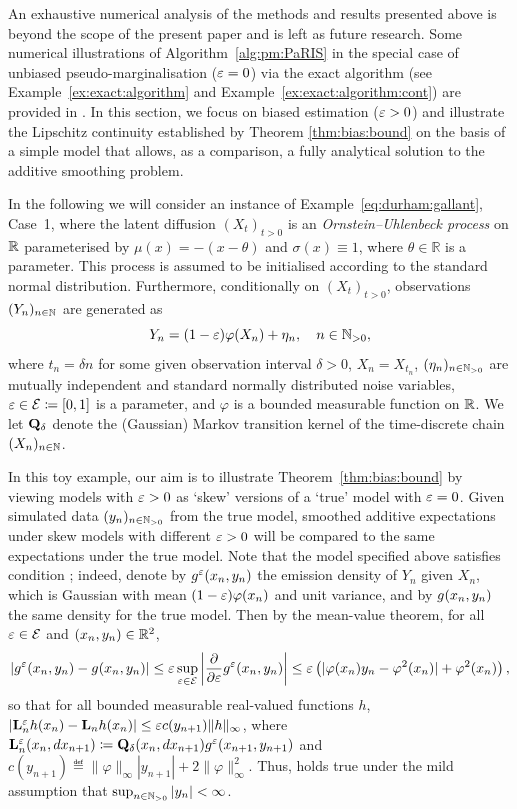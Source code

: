 
An exhaustive numerical analysis of the methods and results presented above is beyond the scope of the present paper and is left as future research. Some numerical illustrations of Algorithm~\ref{alg:pm:PaRIS} in the special case of unbiased pseudo-marginalisation ($\varepsilon = 0$) via the exact algorithm (see Example~\ref{ex:exact:algorithm} and Example~\ref{ex:exact:algorithm:cont}) are provided in \cite{gloaguen2018online}. In this section, we focus on biased estimation ($\varepsilon > 0$) and illustrate the Lipschitz continuity established by Theorem \ref{thm:bias:bound} on the basis of a simple model that allows, as a comparison, a fully analytical solution to the additive smoothing problem.
 
In the following we will consider an instance of Example~\ref{eq:durham:gallant}, Case~1, where the latent diffusion $(X_t)_{t > 0}$ is an \emph{Ornstein--Uhlenbeck process} \cite{uhlenbeck1930theory} on $\mathbb{R}$ parameterised by $\mu(x) = - (x - \theta)$ and $\sigma(x) \equiv 1$,  where $\theta \in \mathbb{R}$ is a parameter.
This process is assumed to be initialised according to the standard normal distribution. Furthermore, conditionally on $(X_t)_{t > 0}$, observations $(Y_n)_{n \in \mathbb{N}}$ are generated as
$$
Y_n = (1 - \varepsilon) \varphi(X_n) + \eta_n, \quad n \in \mathbb{N}_{> 0},
$$
where $t_n = \delta n$ for some given observation interval $\delta > 0$, $X_n = X_{t_n}$, $(\eta_n)_{n \in \mathbb{N}_{> 0}}$ are mutually independent and standard normally distributed noise variables, $\varepsilon \in \mathcal{E} \coloneqq [0, 1]$ is a parameter, and $\varphi$ is a bounded measurable function on $\mathbb{R}$. We let $\mathbf{Q}_\delta$ denote the (Gaussian) Markov transition kernel of the time-discrete chain $(X_n)_{n \in \mathbb{N}}$. 

In this toy example, our aim is to illustrate Theorem~\ref{thm:bias:bound} by viewing models with $\varepsilon > 0$ as `skew' versions of a `true' model with $\varepsilon = 0$. Given simulated data $(y_n)_{n \in \mathbb{N}_{> 0}}$ from the true model, smoothed additive expectations under skew models with different $\varepsilon > 0$ will be compared to the same expectations under the true model. Note that the model specified above satisfies condition ; indeed, denote by $g_{}^\varepsilon(x_n, y_n)$ the emission density of $Y_n$ given $X_n$, which is Gaussian with mean $(1 - \varepsilon) \varphi(x_n)$ and unit variance, and by $g_{}(x_n, y_n)$ the same density for the true model. Then by the mean-value theorem, for all $\varepsilon \in \mathcal{E}$ and $(x_n, y_n) \in \mathbb{R}^2$, 
$$
\left\vert g_{}^\varepsilon(x_n, y_n) - g_{}(x_n, y_n) \right \vert \leq \varepsilon \sup_{\varepsilon \in \mathcal{E}} \left \vert\frac{\partial}{\partial \varepsilon} g_{}^\varepsilon(x_n, y_n) \right\vert 
\leq \varepsilon \left( \vert \varphi(x_n) y_n - \varphi^2(x_n) \vert + \varphi^2(x_n) \right), 
$$
so that for all bounded measurable real-valued functions $h$,  $\vert \mathbf{L}_{n}^\varepsilon h(x_n) - \mathbf{L}_{n} h(x_n) \vert \leq \varepsilon c(y_{n + 1}) \| h\|_\infty$, where $\mathbf{L}_{n}^\varepsilon(x_n, d x_{n + 1}) \coloneqq \mathbf{Q}_\delta(x_n, d x_{n + 1}) g_{}^\varepsilon(x_{n + 1}, y_{n + 1})$ and $c(y_{n + 1}) \eqdef \| \varphi \|_\infty |y_{n + 1}| + 2 \| \varphi \|_\infty^2$. Thus,  holds true under the mild assumption that $\sup_{n \in \mathbb{N}_{> 0}} |y_n| < \infty$. 

